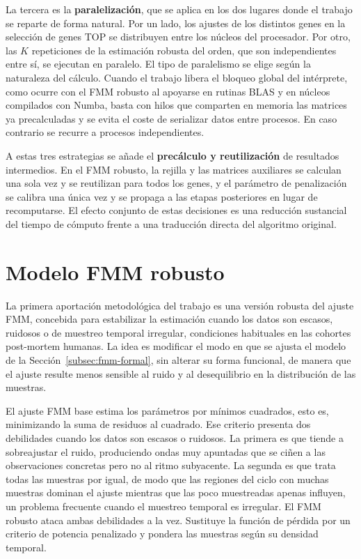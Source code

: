 \documentclass[12pt, a4paper]{report}
\begin{document}
La tercera es la \textbf{paralelización}, que se aplica en los dos lugares donde el trabajo se reparte de forma natural. Por un lado, los ajustes de los distintos genes en la selección de genes TOP se distribuyen entre los núcleos del procesador. Por otro, las $K$ repeticiones de la estimación robusta del orden, que son independientes entre sí, se ejecutan en paralelo. El tipo de paralelismo se elige según la naturaleza del cálculo. Cuando el trabajo libera el bloqueo global del intérprete, como ocurre con el FMM robusto al apoyarse en rutinas BLAS y en núcleos compilados con Numba, basta con hilos que comparten en memoria las matrices ya precalculadas y se evita el coste de serializar datos entre procesos. En caso contrario se recurre a procesos independientes.

A estas tres estrategias se añade el \textbf{precálculo y reutilización} de resultados intermedios. En el FMM robusto, la rejilla y las matrices auxiliares se calculan una sola vez y se reutilizan para todos los genes, y el parámetro de penalización se calibra una única vez y se propaga a las etapas posteriores en lugar de recomputarse. El efecto conjunto de estas decisiones es una reducción sustancial del tiempo de cómputo frente a una traducción directa del algoritmo original.

\section{Modelo FMM robusto}
\label{sec:fmm-robusto}

La primera aportación metodológica del trabajo es una versión robusta del ajuste FMM, concebida para estabilizar la estimación cuando los datos son escasos, ruidosos o de muestreo temporal irregular, condiciones habituales en las cohortes post-mortem humanas. La idea es modificar el modo en que se ajusta el modelo de la Sección~\ref{subsec:fmm-formal}, sin alterar su forma funcional, de manera que el ajuste resulte menos sensible al ruido y al desequilibrio en la distribución de las muestras.

El ajuste FMM base estima los parámetros por mínimos cuadrados, esto es, minimizando la suma de residuos al cuadrado. Ese criterio presenta dos debilidades cuando los datos son escasos o ruidosos. La primera es que tiende a sobreajustar el ruido, produciendo ondas muy apuntadas que se ciñen a las observaciones concretas pero no al ritmo subyacente. La segunda es que trata todas las muestras por igual, de modo que las regiones del ciclo con muchas muestras dominan el ajuste mientras que las poco muestreadas apenas influyen, un problema frecuente cuando el muestreo temporal es irregular. El FMM robusto ataca ambas debilidades a la vez. Sustituye la función de pérdida por un criterio de potencia penalizado y pondera las muestras según su densidad temporal.
\end{document}
